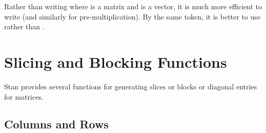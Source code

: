\begin{description}
\begin{description}
\begin{description}
\begin{description}
\begin{description}
\begin{description}
\begin{description}
\begin{description}
\begin{description}
\begin{description}
\begin{description}
\begin{description}
\begin{description}
\begin{description}
\begin{description}
\begin{description}
\begin{description}
\begin{description}
\begin{description}
\begin{description}
\begin{description}
\begin{description}
\begin{description}
\begin{description}
\begin{description}
\begin{description}
\begin{description}
\begin{description}
\begin{description}
\begin{description}
\begin{description}
\begin{description}
\begin{description}
\begin{description}
\begin{description}
\begin{description}
\begin{description}
\begin{description}
\begin{description}
\begin{description}
\begin{description}
\begin{description}
\begin{description}
\begin{description}
\begin{description}
\begin{description}
\begin{description}
\begin{description}
\begin{description}
\begin{description}
\begin{description}
\begin{description}
\begin{description}
\begin{description}
Rather than writing  where  is a matrix and  is a vector, it is much more efficient to write  (and similarly for pre-multiplication). By the same token, it is better to use  rather than .

\section{Slicing and Blocking Functions}

Stan provides several functions for generating slices or blocks or diagonal entries for matrices.

\subsection{Columns and Rows}

\begin{description} %


\end{description}
\end{description}
\end{description}
\end{description}
\end{description}
\end{description}
\end{description}
\end{description}
\end{description}
\end{description}
\end{description}
\end{description}
\end{description}
\end{description}
\end{description}
\end{description}
\end{description}
\end{description}
\end{description}
\end{description}
\end{description}
\end{description}
\end{description}
\end{description}
\end{description}
\end{description}
\end{description}
\end{description}
\end{description}
\end{description}
\end{description}
\end{description}
\end{description}
\end{description}
\end{description}
\end{description}
\end{description}
\end{description}
\end{description}
\end{description}
\end{description}
\end{description}
\end{description}
\end{description}
\end{description}
\end{description}
\end{description}
\end{description}
\end{description}
\end{description}
\end{description}
\end{description}
\end{description}
\end{description}
\end{description}
